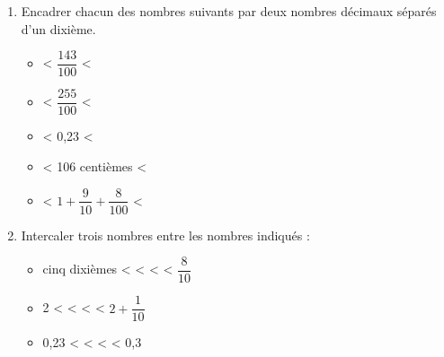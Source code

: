 \begin{activite}
\begin{enumerate}
\begin{spacing}{1.6}
\begin{multicols}{2}
                \end{multicols}
            \end{spacing}
            \vspace*{-3mm}
             \item Encadrer chacun des nombres suivants par deux nombres décimaux séparés d'un dixième.
             \begin{spacing}{1.6}
                \begin{multicols}{2}
                    \begin{itemize}
                        \item \makebox[0.2\linewidth]{\dotfill} < $\dfrac{143}{100}$ <               \makebox[0.2\linewidth]{\dotfill}
                        \item \makebox[0.2\linewidth]{\dotfill} < $\dfrac{255}{100}$ <               \makebox[0.2\linewidth]{\dotfill}
                        \item \makebox[0.2\linewidth]{\dotfill} < 0,23 <                             \makebox[0.2\linewidth]{\dotfill}
                        \item \makebox[0.2\linewidth]{\dotfill} < {\small 106 centièmes} <           \makebox[0.2\linewidth]{\dotfill}
                        \item \makebox[0.2\linewidth]{\dotfill} < $1+\dfrac{9}{10}+\dfrac{8}{100}$ < \makebox[0.2\linewidth]{\dotfill}
                    \end{itemize}
                \end{multicols}
            \end{spacing}
            \vspace*{-3mm}
             \item Intercaler trois nombres entre les nombres indiqués : 
             \begin{spacing}{1}
                \begin{itemize}
                    \item cinq dixièmes <\makebox[0.2\linewidth]{\dotfill} < \makebox[0.2\linewidth]{\dotfill} < \makebox[0.2\linewidth]{\dotfill} < $\dfrac{8}{10}$\\
                    \item 2             <\makebox[0.2\linewidth]{\dotfill} < \makebox[0.2\linewidth]{\dotfill} < \makebox[0.2\linewidth]{\dotfill} < $2+\dfrac{1}{10}$\\
                    \item 0,23          <\makebox[0.2\linewidth]{\dotfill} < \makebox[0.2\linewidth]{\dotfill} < \makebox[0.2\linewidth]{\dotfill} < 0,3
                \end{itemize}
            \end{spacing}
            \vspace*{-50mm}
          \end{enumerate}
 \end{activite} 